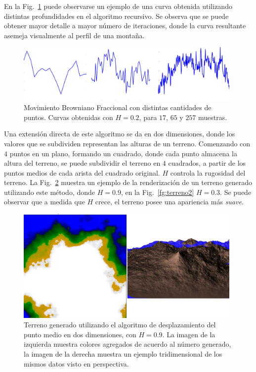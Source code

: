 En la Fig.~\ref{fg:puntomedio} puede observarse un ejemplo de una curva obtenida utilizando distintas profundidades en el algoritmo recursivo.
Se observa que se puede obtener mayor detalle a mayor número de iteraciones, donde la curva resultante asemeja visualmente al perfil de una montaña.

\begin{figure}
\center
\includegraphics[width=11cm]{figures/puntomedio}
\caption[Movimiento Browniano Fraccional con distintas cantidades de puntos.]{Movimiento Browniano Fraccional con distintas cantidades de puntos. Curvas obtenidas con $H=0.2$, para $17$, $65$ y $257$ muestras.}
\label{fg:puntomedio}
\end{figure}


Una extensión directa de este algoritmo se da en dos dimensiones, donde los valores que se subdividen representan las alturas de un terreno.
Comenzando con $4$ puntos en un plano, formando un cuadrado, donde cada punto almacena la altura del terreno, se puede subdividir el terreno en $4$ cuadrados, a partir de los puntos medios de cada arista del cuadrado original.
$H$ controla la rugosidad del terreno.
La Fig.~\ref{fg:terreno} muestra un ejemplo de la renderización de un terreno generado utilizando este método, donde $H = 0.9$, en la Fig.~\ref{fg:terreno2} $H = 0.3$.
Se puede observar que a medida que $H$ crece, el terreno posee una apariencia más {\em suave}.

\begin{figure}
\center
\includegraphics[width=11cm]{figures/terreno}
\caption[Terreno generado utilizando el algoritmo de desplazamiento del punto medio en dos dimensiones, con $H = 0.9$]{Terreno generado utilizando el algoritmo de desplazamiento del punto medio en dos dimensiones, con $H = 0.9$. La imagen de la izquierda muestra colores agregados de acuerdo al número generado, la imagen de la derecha muestra un ejemplo tridimensional de los mismos datos visto en perspectiva.}
\label{fg:terreno}
\end{figure}

